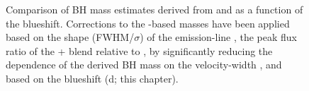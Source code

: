 \begin{figure}
    \captionsetup[subfigure]{labelformat=empty}
    \centering 
    \subfloat[\label{fig:compare_corrections_a}]{}
    \subfloat[\label{fig:compare_corrections_b}]{}
    \subfloat[\label{fig:compare_corrections_c}]{}
    \subfloat[\label{fig:compare_corrections_d}]{}
    \caption[{Comparison of BH mass estimates derived from  and \ha as a function of the  blueshift.}]{Comparison of BH mass estimates derived from  and \ha as a function of the  blueshift. Corrections to the -based masses have been applied based on the shape (FWHM/$\sigma$) of the  emission-line \citep[a;][]{denney12}, the peak flux ratio of the + blend relative to  \citep[b;][]{runnoe13}, by significantly reducing the dependence of the derived BH mass on the  velocity-width \citep[c;][]{park13}, and based on the  blueshift (d; this chapter).}
    \label{fig:compare_corrections}
\end{figure}

